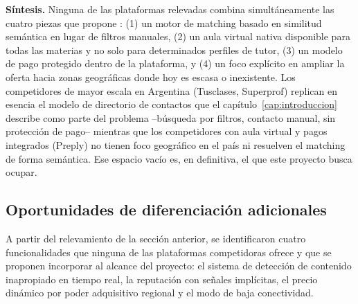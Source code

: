 \textbf{Síntesis.} Ninguna de las plataformas relevadas combina
simultáneamente las cuatro piezas que propone \sistema{}: (1) un motor de
\gls{matching} basado en similitud semántica en lugar de filtros
manuales, (2) un aula virtual nativa disponible para todas las materias
y no solo para determinados perfiles de tutor, (3) un modelo de pago
protegido dentro de la plataforma, y (4) un foco explícito en ampliar la
oferta hacia zonas geográficas donde hoy es escasa o inexistente. Los
competidores de mayor escala en Argentina (Tusclases, Superprof)
replican en esencia el modelo de directorio de contactos que el
capítulo~\ref{cap:introduccion} describe como parte del problema
--búsqueda por filtros, contacto manual, sin protección de pago--
mientras que los competidores con aula virtual y pagos integrados
(Preply) no tienen foco geográfico en el país ni resuelven el
\gls{matching} de forma semántica. Ese espacio vacío es, en definitiva,
el que este proyecto busca ocupar.

\subsection{Oportunidades de diferenciación adicionales}

A partir del relevamiento de la sección anterior, se identificaron
cuatro funcionalidades que ninguna de las plataformas competidoras
ofrece y que se proponen incorporar al alcance del proyecto: el sistema
de detección de contenido inapropiado en tiempo real, la reputación con
señales implícitas, el precio dinámico por poder adquisitivo regional y
el modo de baja conectividad.

